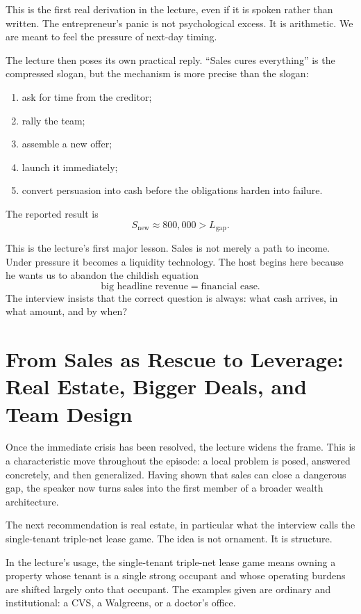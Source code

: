 This is the first real derivation in the lecture, even if it is spoken rather than written. The entrepreneur's panic is not psychological excess. It is arithmetic. We are meant to feel the pressure of next-day timing.

The lecture then poses its own practical reply. ``Sales cures everything'' is the compressed slogan, but the mechanism is more precise than the slogan:
\begin{enumerate}
\item ask for time from the creditor;
\item rally the team;
\item assemble a new offer;
\item launch it immediately;
\item convert persuasion into cash before the obligations harden into failure.
\end{enumerate}

The reported result is
\begin{equation}
S_{\text{new}} \approx 800{,}000 > L_{\text{gap}}.
\end{equation}

This is the lecture's first major lesson. Sales is not merely a path to income. Under pressure it becomes a liquidity technology. The host begins here because he wants us to abandon the childish equation
\[
\text{big headline revenue} = \text{financial ease}.
\]
The interview insists that the correct question is always: what cash arrives, in what amount, and by when?

\section{From Sales as Rescue to Leverage: Real Estate, Bigger Deals, and Team Design}

Once the immediate crisis has been resolved, the lecture widens the frame. This is a characteristic move throughout the episode: a local problem is posed, answered concretely, and then generalized. Having shown that sales can close a dangerous gap, the speaker now turns sales into the first member of a broader wealth architecture.

The next recommendation is real estate, in particular what the interview calls the single-tenant triple-net lease game. The idea is not ornament. It is structure.

\begin{definition}
In the lecture's usage, the single-tenant triple-net lease game means owning a property whose tenant is a single strong occupant and whose operating burdens are shifted largely onto that occupant. The examples given are ordinary and institutional: a CVS, a Walgreens, or a doctor's office.
\end{definition}

